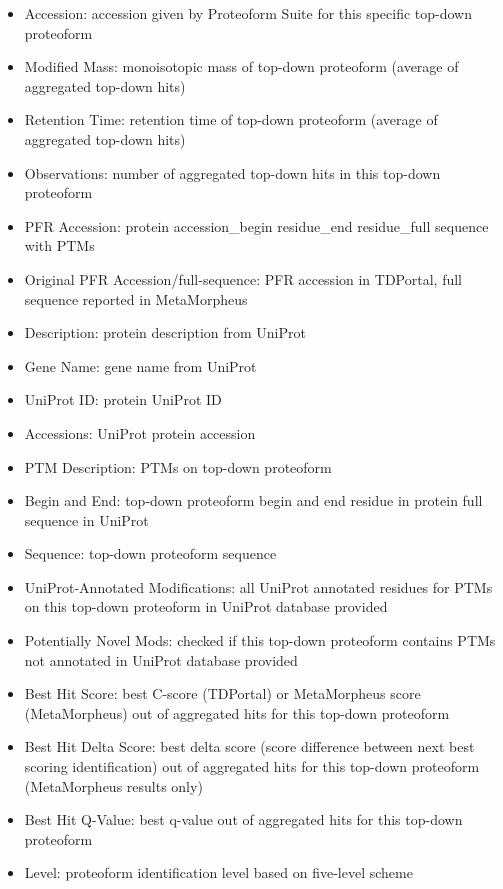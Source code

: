 \begin{itemize}
\begin{figure}[h]
\end{figure}
	\begin{itemize}
		\item Accession: accession given by Proteoform Suite for this specific top-down proteoform
		\item Modified Mass: monoisotopic mass of top-down proteoform (average of aggregated top-down hits)
		\item Retention Time: retention time of top-down proteoform (average of aggregated top-down hits)
		\item Observations: number of aggregated top-down hits in this top-down proteoform
		\item PFR Accession: protein accession\_begin residue\_end residue\_full sequence with PTMs
		\item Original PFR Accession/full-sequence: PFR accession in TDPortal, full sequence reported in MetaMorpheus
		\item Description: protein description from UniProt
		\item Gene Name: gene name from UniProt
		\item UniProt ID: protein UniProt ID
		\item Accessions: UniProt protein accession
		\item PTM Description: PTMs on top-down proteoform
		\item Begin and End: top-down proteoform begin and end residue in protein full sequence in UniProt
		\item Sequence: top-down proteoform sequence
		\item UniProt-Annotated Modifications: all UniProt annotated residues for PTMs on this top-down proteoform in UniProt database provided
		\item Potentially Novel Mods: checked if this top-down proteoform contains PTMs not annotated in UniProt database provided
		\item Best Hit Score: best C-score (TDPortal) or MetaMorpheus score (MetaMorpheus) out of aggregated hits for this top-down proteoform
		\item Best Hit Delta Score: best delta score (score difference between next best scoring identification) out of aggregated hits for this top-down proteoform (MetaMorpheus results only)
		\item Best Hit Q-Value: best q-value out of aggregated hits for this top-down proteoform
		\item Level: proteoform identification level based on five-level scheme\supercite{Smith2019b}

\end{itemize}
\end{itemize}
